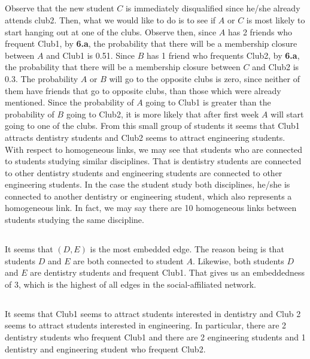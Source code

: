 \documentclass[12pt]{article}
\begin{document}
\subsection{}
Observe that the new student $C$ is immediately disqualified since he/she already attends club2. Then, what we would like to do is to see if $A$ or $C$ is most likely to start hanging out at one of the clubs. Observe then, since $A$ has 2 friends who frequent Club1, by \textbf{6.a}, the probability that there will be a membership closure between $A$ and Club1 is 0.51. Since $B$ has 1 friend who frequents Club2, by \textbf{6.a}, the probability that there will be a membership closure between $C$ and Club2 is 0.3. The probability $A$ or $B$ will go to the opposite clubs is zero, since neither of them have friends that go to opposite clubs, than those which were already mentioned. Since the probability of $A$ going to Club1 is greater than the probability of $B$ going to Club2, it is more likely that after first week $A$ will start going to one of the clubs. 
\newline 
\newline 
From this small group of students it seems that Club1 attracts dentistry students and Club2 seems to attract engineering students. With respect to homogeneous links, we may see that students who are connected to students studying similar disciplines. That is dentistry students are connected to other dentistry students and engineering students are connected to other engineering students. In the case the student study both disciplines, he/she is connected to another dentistry or engineering student, which also represents a homogeneous link. In fact, we may say there are 10 homogeneous links between students studying the same discipline. 
\subsection{}
It seems that $(D,E)$ is the most embedded edge. The reason being is that students $D$ and $E$ are both connected to student $A$. Likewise, both students $D$ and $E$ are dentistry students and frequent Club1. That gives us an embeddedness of 3, which is the highest of all edges in the social-affiliated network.  
\subsection{}
It seems that Club1 seems to attract students interested in dentistry and Club 2 seems to attract students interested in engineering. In particular, there are 2 dentistry students who frequent Club1 and there are 2 engineering students and 1 dentistry and engineering student who frequent Club2. 
\newpage
\end{document}
